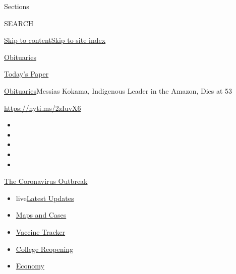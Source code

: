 Sections

SEARCH

\protect\hyperlink{site-content}{Skip to
content}\protect\hyperlink{site-index}{Skip to site index}

\href{https://www.nytimes.com/section/obituaries}{Obituaries}

\href{https://myaccount.nytimes.com/auth/login?response_type=cookie\&client_id=vi}{}

\href{https://www.nytimes.com/section/todayspaper}{Today's Paper}

\href{/section/obituaries}{Obituaries}\textbar{}Messias Kokama,
Indigenous Leader in the Amazon, Dies at 53

\url{https://nyti.ms/2zIuvX6}

\begin{itemize}
\item
\item
\item
\item
\item
\end{itemize}

\href{https://www.nytimes.com/news-event/coronavirus?action=click\&pgtype=Article\&state=default\&region=TOP_BANNER\&context=storylines_menu}{The
Coronavirus Outbreak}

\begin{itemize}
\tightlist
\item
  live\href{https://www.nytimes.com/2020/08/03/world/coronavirus-covid-19.html?action=click\&pgtype=Article\&state=default\&region=TOP_BANNER\&context=storylines_menu}{Latest
  Updates}
\item
  \href{https://www.nytimes.com/interactive/2020/us/coronavirus-us-cases.html?action=click\&pgtype=Article\&state=default\&region=TOP_BANNER\&context=storylines_menu}{Maps
  and Cases}
\item
  \href{https://www.nytimes.com/interactive/2020/science/coronavirus-vaccine-tracker.html?action=click\&pgtype=Article\&state=default\&region=TOP_BANNER\&context=storylines_menu}{Vaccine
  Tracker}
\item
  \href{https://www.nytimes.com/2020/08/02/us/covid-college-reopening.html?action=click\&pgtype=Article\&state=default\&region=TOP_BANNER\&context=storylines_menu}{College
  Reopening}
\item
  \href{https://www.nytimes.com/live/2020/08/03/business/stock-market-today-coronavirus?action=click\&pgtype=Article\&state=default\&region=TOP_BANNER\&context=storylines_menu}{Economy}
\end{itemize}


